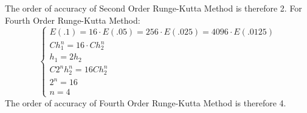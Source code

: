 \documentclass[12pt]{article}
\begin{document}
The order of accuracy of Second Order Runge-Kutta Method is therefore 2.
For Fourth Order Runge-Kutta Method:
\begin{equation}
\left\{ %
\begin{array}{cccc}
  E(.1) = 16 \cdot E(.05) = 256 \cdot E(.025) = 4096 \cdot E(.0125) \\
  Ch_1^n = 16 \cdot Ch_2^n \\
  h_1 = 2h_2 \\
  C2^nh_2^n = 16Ch_2^n \\
  2^n = 16 \\
  n = 4
\end{array}
\right. %
\label{eq::curly}
\end{equation}
The order of accuracy of Fourth Order Runge-Kutta Method is therefore 4.

\clearpage
\appendix
\end{document}
